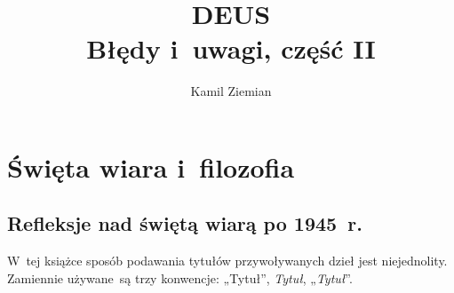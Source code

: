 \documentclass[a4paper,11pt]{article}
\title{DEUS \\
  {\Large Błędy i~uwagi, część II}}
\author{Kamil Ziemian}
\begin{document}





\maketitle  %





\section{Święta wiara i~filozofia}

\vspace{\spaceTwo}














\subsection{Refleksje nad świętą wiarą po 1945~r.}

\vspace{\spaceThree}



{}




\start W~tej książce sposób podawania tytułów przywoływanych dzieł
jest niejednolity. Zamiennie używane~są trzy konwencje: „Tytuł”,
\textit{Tytuł}, „\textit{Tytuł}”.
\end{document}
